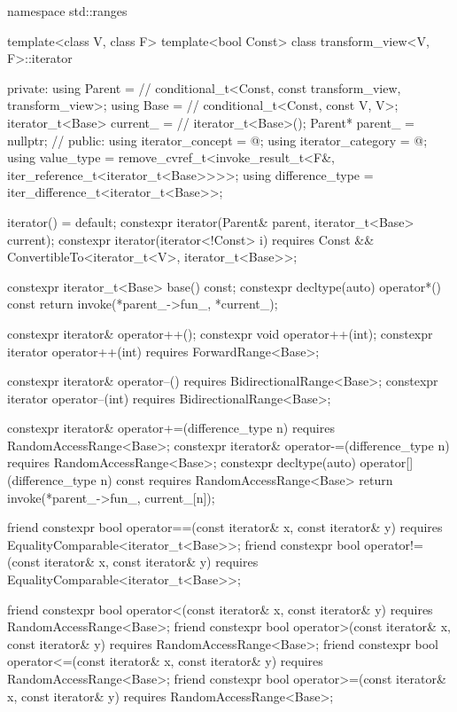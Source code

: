 \begin{codeblock}
namespace std::ranges {
  template<class V, class F>
  template<bool Const>
  class transform_view<V, F>::iterator {
  private:
    using Parent =                              // \expos
      conditional_t<Const, const transform_view, transform_view>;
    using Base   =                              // \expos
      conditional_t<Const, const V, V>;
    iterator_t<Base> current_ =                 // \expos
      iterator_t<Base>();
    Parent* parent_ = nullptr;                  // \expos
  public:
    using iterator_concept  = @\seebelow@;
    using iterator_category = @\seebelow@;
    using value_type        =
      remove_cvref_t<invoke_result_t<F&, iter_reference_t<iterator_t<Base>>>>;
    using difference_type   = iter_difference_t<iterator_t<Base>>;

    iterator() = default;
    constexpr iterator(Parent& parent, iterator_t<Base> current);
    constexpr iterator(iterator<!Const> i)
      requires Const && ConvertibleTo<iterator_t<V>, iterator_t<Base>>;

    constexpr iterator_t<Base> base() const;
    constexpr decltype(auto) operator*() const
    { return invoke(*parent_->fun_, *current_); }

    constexpr iterator& operator++();
    constexpr void operator++(int);
    constexpr iterator operator++(int) requires ForwardRange<Base>;

    constexpr iterator& operator--() requires BidirectionalRange<Base>;
    constexpr iterator operator--(int) requires BidirectionalRange<Base>;

    constexpr iterator& operator+=(difference_type n)
      requires RandomAccessRange<Base>;
    constexpr iterator& operator-=(difference_type n)
      requires RandomAccessRange<Base>;
    constexpr decltype(auto) operator[](difference_type n) const
      requires RandomAccessRange<Base>
    { return invoke(*parent_->fun_, current_[n]); }

    friend constexpr bool operator==(const iterator& x, const iterator& y)
      requires EqualityComparable<iterator_t<Base>>;
    friend constexpr bool operator!=(const iterator& x, const iterator& y)
      requires EqualityComparable<iterator_t<Base>>;

    friend constexpr bool operator<(const iterator& x, const iterator& y)
      requires RandomAccessRange<Base>;
    friend constexpr bool operator>(const iterator& x, const iterator& y)
      requires RandomAccessRange<Base>;
    friend constexpr bool operator<=(const iterator& x, const iterator& y)
      requires RandomAccessRange<Base>;
    friend constexpr bool operator>=(const iterator& x, const iterator& y)
      requires RandomAccessRange<Base>;

}}
\end{codeblock}
